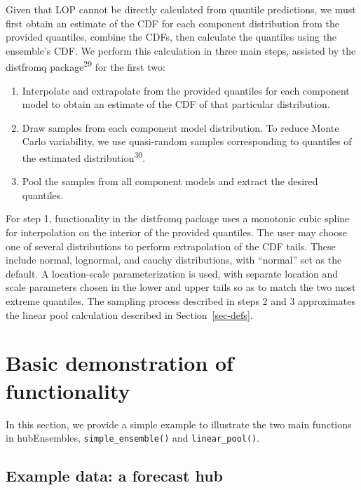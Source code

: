 \documentclass[
  letterpaper,
  DIV=11,
  numbers=noendperiod]{scrartcl}
\providecommand{\tightlist}{%
  \setlength{\itemsep}{0pt}\setlength{\parskip}{0pt}}\usepackage{longtable,booktabs,array}
\begin{document}
Given that LOP cannot be directly calculated from quantile predictions,
we must first obtain an estimate of the CDF for each component
distribution from the provided quantiles, combine the CDFs, then
calculate the quantiles using the ensemble's CDF. We perform this
calculation in three main steps, assisted by the {distfromq}
package\textsuperscript{29} for the first two:

\begin{enumerate}
\def\labelenumi{\arabic{enumi}.}
\tightlist
\item
  Interpolate and extrapolate from the provided quantiles for each
  component model to obtain an estimate of the CDF of that particular
  distribution.
\item
  Draw samples from each component model distribution. To reduce Monte
  Carlo variability, we use quasi-random samples corresponding to
  quantiles of the estimated distribution\textsuperscript{30}.
\item
  Pool the samples from all component models and extract the desired
  quantiles.
\end{enumerate}

For step 1, functionality in the {distfromq} package uses a monotonic
cubic spline for interpolation on the interior of the provided
quantiles. The user may choose one of several distributions to perform
extrapolation of the CDF tails. These include normal, lognormal, and
cauchy distributions, with ``normal'' set as the default. A
location-scale parameterization is used, with separate location and
scale parameters chosen in the lower and upper tails so as to match the
two most extreme quantiles. The sampling process described in steps 2
and 3 approximates the linear pool calculation described in
Section~\ref{sec-defs}.

\section{Basic demonstration of functionality}\label{sec-simple-ex}

In this section, we provide a simple example to illustrate the two main
functions in {hubEnsembles}, \texttt{simple\_ensemble()} and
\texttt{linear\_pool()}.

\subsection{Example data: a forecast
hub}\label{example-data-a-forecast-hub}
\end{document}
